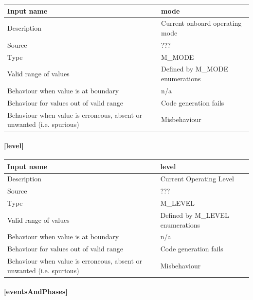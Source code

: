 \begin{longtable}{p{}p{}}
\toprule
Input name				& mode \\
\midrule
Description				& Current onboard operating mode \\
\midrule
Source					& ??? \\ 
\midrule
Type					& M\_MODE \\
\midrule
Valid range of values	& Defined by M\_MODE enumerations \\
\midrule
Behaviour when value is at boundary	& n/a \\
\midrule
Behaviour for values out of valid range	& Code generation fails \\
\midrule
Behaviour when value is erroneous, absent or unwanted (i.e. spurious) & Misbehaviour \\
\bottomrule
\end{longtable}


\paragraph{[level]}

\begin{longtable}{p{}p{}}
\toprule
Input name				& level \\
\midrule
Description				& Current Operating Level \\
\midrule
Source					& ??? \\ 
\midrule
Type					& M\_LEVEL \\
\midrule
Valid range of values	& Defined by M\_LEVEL enumerations \\
\midrule
Behaviour when value is at boundary	& n/a \\
\midrule
Behaviour for values out of valid range	&  Code generation fails \\
\midrule
Behaviour when value is erroneous, absent or unwanted (i.e. spurious) & Misbehaviour \\
\bottomrule
\end{longtable}

\paragraph{[eventsAndPhases]}

